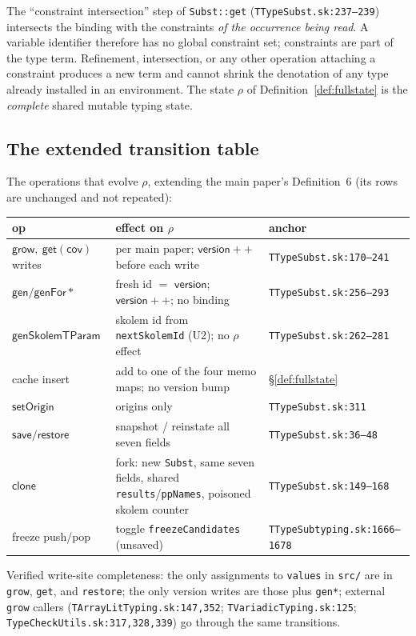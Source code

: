 \documentclass[11pt]{article}
\begin{document}
\begin{corollary}
\label{cor:occurrence}
The ``constraint intersection'' step of \texttt{Subst::get}
(\texttt{TTypeSubst.sk:237--239}) intersects the binding with the
constraints \emph{of the occurrence being read}. A variable identifier
therefore has no global constraint set; constraints are part of the type
term. Refinement, intersection, or any other operation attaching a
constraint produces a new term and cannot shrink the denotation of any
type already installed in an environment. The state $\rho$ of
Definition~\ref{def:fullstate} is the \emph{complete} shared mutable
typing state.
\end{corollary}

\subsection{The extended transition table}

\begin{definition}
\label{def:ext-transitions}
The operations that evolve $\rho$, extending the main paper's
Definition~6 (its rows are unchanged and not repeated):
\begin{center}
\renewcommand{\arraystretch}{1.2}
\footnotesize
\begin{tabular}{@{}lll@{}}
\toprule
op & effect on $\rho$ & anchor \\
\midrule
$\mathsf{grow},\ \mathsf{get}(\mathsf{cov})$ writes &
  per main paper; $\mathsf{version}{+}{+}$ before each write &
  \texttt{TTypeSubst.sk:170--241} \\
$\mathsf{gen}/\mathsf{genFor*}$ &
  fresh id $=$ $\mathsf{version}$; $\mathsf{version}{+}{+}$; no binding &
  \texttt{TTypeSubst.sk:256--293} \\
$\mathsf{genSkolemTParam}$ & skolem id from \texttt{nextSkolemId} (U2);
  no $\rho$ effect & \texttt{TTypeSubst.sk:262--281} \\
cache insert & add to one of the four memo maps; no version bump &
  \S\ref{def:fullstate} \\
$\mathsf{setOrigin}$ & origins only & \texttt{TTypeSubst.sk:311} \\
$\mathsf{save}/\mathsf{restore}$ & snapshot / reinstate all seven fields &
  \texttt{TTypeSubst.sk:36--48} \\
$\mathsf{clone}$ & fork: new \texttt{Subst}, same seven fields, shared
  \texttt{results}/\texttt{ppNames}, poisoned skolem counter &
  \texttt{TTypeSubst.sk:149--168} \\
freeze push/pop & toggle \texttt{freezeCandidates} (unsaved) &
  \texttt{TTypeSubtyping.sk:1666--1678} \\
\bottomrule
\end{tabular}
\end{center}
Verified write-site completeness: the only assignments to
\texttt{values} in \texttt{src/} are in \texttt{grow}, \texttt{get}, and
\texttt{restore}; the only version writes are those plus \texttt{gen*};
external \texttt{grow} callers (\texttt{TArrayLitTyping.sk:147,352};
\texttt{TVariadicTyping.sk:125}; \texttt{TypeCheckUtils.sk:317,328,339})
go through the same transitions.
\end{definition}
\end{document}
